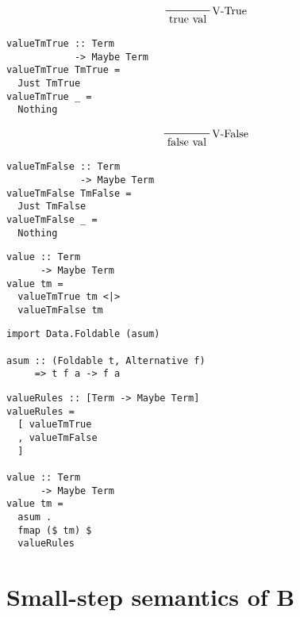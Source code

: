 \documentclass[aspectration=169]{beamer}
\begin{document}
\begin{frame}[fragile]
  \begin{displaymath}
    \prftree[r]{V-True}{\text{true val}}
  \end{displaymath}
 \begin{verbatim}
valueTmTrue :: Term 
            -> Maybe Term
valueTmTrue TmTrue = 
  Just TmTrue
valueTmTrue _ = 
  Nothing
 \end{verbatim}
\end{frame}

\begin{frame}[fragile]
  \begin{displaymath}
    \prftree[r]{V-False}{\text{false val}}
  \end{displaymath}
 \begin{verbatim}
valueTmFalse :: Term 
             -> Maybe Term
valueTmFalse TmFalse = 
  Just TmFalse
valueTmFalse _ = 
  Nothing
 \end{verbatim}
\end{frame}

\begin{frame}[fragile]
 \begin{verbatim}
value :: Term 
      -> Maybe Term
value tm =
  valueTmTrue tm <|>
  valueTmFalse tm
 \end{verbatim}
\end{frame}

\begin{frame}[fragile]
 \begin{verbatim}
import Data.Foldable (asum)

asum :: (Foldable t, Alternative f) 
     => t f a -> f a
 \end{verbatim}
\end{frame}

\begin{frame}[fragile]
 \begin{verbatim}
valueRules :: [Term -> Maybe Term]
valueRules =
  [ valueTmTrue
  , valueTmFalse
  ]

value :: Term 
      -> Maybe Term
value tm =
  asum .
  fmap ($ tm) $
  valueRules
 \end{verbatim}
\end{frame}

\section{Small-step semantics of B}
\end{document}
